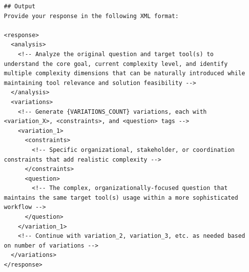 \begin{verbatim}
## Output
Provide your response in the following XML format:

<response>
  <analysis>
    <!-- Analyze the original question and target tool(s) to understand the core goal, current complexity level, and identify multiple complexity dimensions that can be naturally introduced while maintaining tool relevance and solution feasibility -->
  </analysis>
  <variations>
    <!-- Generate {VARIATIONS_COUNT} variations, each with <variation_X>, <constraints>, and <question> tags -->
    <variation_1>
      <constraints>
        <!-- Specific organizational, stakeholder, or coordination constraints that add realistic complexity -->
      </constraints>
      <question>
        <!-- The complex, organizationally-focused question that maintains the same target tool(s) usage within a more sophisticated workflow -->
      </question>
    </variation_1>
    <!-- Continue with variation_2, variation_3, etc. as needed based on number of variations -->
  </variations>
</response>

\end{verbatim}


